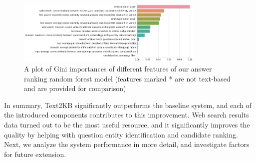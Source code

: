 \begin{figure}
\centering
\includegraphics[width=0.8\textwidth]{img/feature_importances}
\vspace{-4mm}
\caption{A plot of Gini importances of different features of our answer ranking random forest model (features marked * are not text-based and are provided for comparison)}
\label{fig:feature_importances}
\end{figure}

In summary, Text2KB significantly outperforms the baseline system, and each of the introduced components contributes to this improvement.
Web search results data turned out to be the most useful resource, and it significantly improves the quality by helping with question entity identification and candidate ranking.
Next, we analyze the system performance in more detail, and investigate factors for future extension.